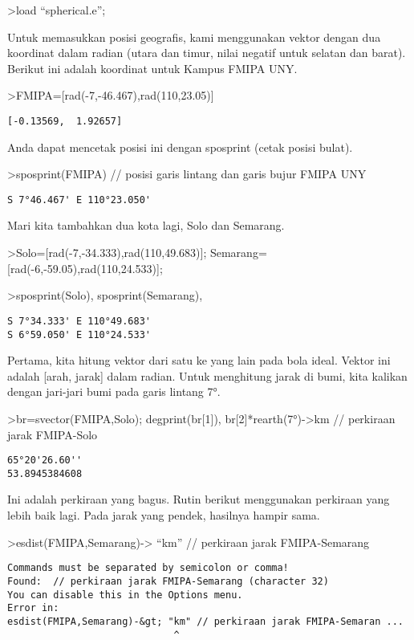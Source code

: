 \documentclass[
]{book}
\begin{document}
\textgreater load ``spherical.e'';

Untuk memasukkan posisi geografis, kami menggunakan vektor dengan dua koordinat dalam radian (utara dan timur, nilai negatif untuk selatan dan barat). Berikut ini adalah koordinat untuk Kampus FMIPA UNY.

\textgreater FMIPA={[}rad(-7,-46.467),rad(110,23.05){]}

\begin{verbatim}
[-0.13569,  1.92657]
\end{verbatim}

Anda dapat mencetak posisi ini dengan sposprint (cetak posisi bulat).

\textgreater sposprint(FMIPA) // posisi garis lintang dan garis bujur FMIPA UNY

\begin{verbatim}
S 7°46.467' E 110°23.050'
\end{verbatim}

Mari kita tambahkan dua kota lagi, Solo dan Semarang.

\textgreater Solo={[}rad(-7,-34.333),rad(110,49.683){]}; Semarang={[}rad(-6,-59.05),rad(110,24.533){]};

\textgreater sposprint(Solo), sposprint(Semarang),

\begin{verbatim}
S 7°34.333' E 110°49.683'
S 6°59.050' E 110°24.533'
\end{verbatim}

Pertama, kita hitung vektor dari satu ke yang lain pada bola ideal. Vektor ini adalah {[}arah, jarak{]} dalam radian. Untuk menghitung jarak di bumi, kita kalikan dengan jari-jari bumi pada garis lintang 7°.

\textgreater br=svector(FMIPA,Solo); degprint(br{[}1{]}), br{[}2{]}*rearth(7°)-\textgreater km // perkiraan jarak FMIPA-Solo

\begin{verbatim}
65°20'26.60''
53.8945384608
\end{verbatim}

Ini adalah perkiraan yang bagus. Rutin berikut menggunakan perkiraan yang lebih baik lagi. Pada jarak yang pendek, hasilnya hampir sama.

\textgreater esdist(FMIPA,Semarang)-\textgreater{} ``km'' // perkiraan jarak FMIPA-Semarang

\begin{verbatim}
Commands must be separated by semicolon or comma!
Found:  // perkiraan jarak FMIPA-Semarang (character 32)
You can disable this in the Options menu.
Error in:
esdist(FMIPA,Semarang)-&gt; "km" // perkiraan jarak FMIPA-Semaran ...
                             ^
\end{verbatim}
\end{document}
